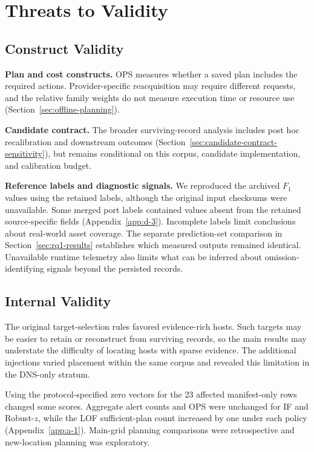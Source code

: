 \documentclass[sn-basic]{sn-jnl}%
\theoremstyle{thmstyleone}%
\theoremstyle{thmstyletwo}%
\theoremstyle{thmstylethree}%
\begin{document}
\section{Threats to Validity}\label{sec:threats-to-validity}

\subsection{Construct Validity}\label{sec:construct-validity}

\textbf{Plan and cost constructs.} OPS measures whether a saved plan includes the required actions. Provider-specific reacquisition may require different requests, and the relative family weights do not measure execution time or resource use (Section~\ref{sec:offline-planning}).

\textbf{Candidate contract.} The broader surviving-record analysis includes post hoc recalibration and downstream outcomes (Section~\ref{sec:candidate-contract-sensitivity}), but remains conditional on this corpus, candidate implementation, and calibration budget.

\textbf{Reference labels and diagnostic signals.} We reproduced the archived \(F_1\) values using the retained labels, although the original input checksums were unavailable. Some merged port labels contained values absent from the retained source-specific fields (Appendix~\ref{app:d-3}). Incomplete labels limit conclusions about real-world asset coverage. The separate prediction-set comparison in Section~\ref{sec:rq1-results} establishes which measured outputs remained identical. Unavailable runtime telemetry also limits what can be inferred about omission-identifying signals beyond the persisted records.

\subsection{Internal Validity}\label{sec:internal-validity}

The original target-selection rules favored evidence-rich hosts. Such targets may be easier to retain or reconstruct from surviving records, so the main results may understate the difficulty of locating hosts with sparse evidence. The additional injections varied placement within the same corpus and revealed this limitation in the DNS-only stratum.

Using the protocol-specified zero vectors for the 23 affected manifest-only rows changed some scores. Aggregate alert counts and OPS were unchanged for IF and Robust-\(z\), while the LOF sufficient-plan count increased by one under each policy (Appendix~\ref{app:a-1}). Main-grid planning comparisons were retrospective and new-location planning was exploratory.
\end{document}
